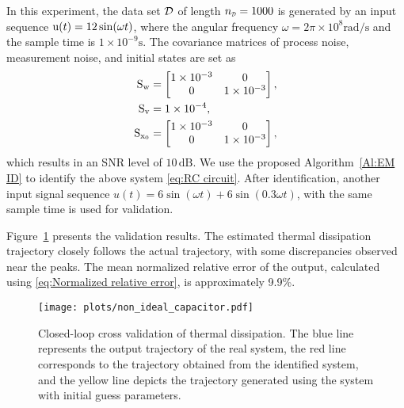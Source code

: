 In this experiment, the data set ${\mathcal{D}}$ of length $\nD = 1000$ is generated by an input sequence ${ \mathrm{u} }(t) = 12\sin(\omega t)$, where the angular frequency $\omega = 2\pi\times10^{8} \text{rad/s}$ and the sample time is $1\times10^{-9} \text{s}$. The covariance matrices of process noise, measurement noise, and initial states are set as
\begin{subequations}\label{eq:RC covariance}
\begin{align} 
        { \mathrm{S} }_{ \mathrm{w} } &= \begin{bmatrix}
            1\times10^{-3} & 0 \\ 0 & 1\times10^{-3}
        \end{bmatrix},
        \\
        { \mathrm{S} }_{ \mathrm{v} } &= 1\times10^{-4}, \\
        { \mathrm{S} }_{{ \mathrm{x} }_0} &= \begin{bmatrix}
            1\times10^{-3} & 0 \\ 0 & 1\times10^{-3}
        \end{bmatrix},
\end{align}
\end{subequations}
which results in an SNR level of $10\,\text{dB}$. We use the proposed Algorithm~\ref{Al:EM ID} to identify the above system \eqref{eq:RC circuit}. After identification, another input signal sequence $u(t) = 6\sin(\omega t) + 6\sin(0.3\omega t)$, with the same sample time is used for validation.

Figure~\ref{img:validation2} presents the validation results. The estimated thermal dissipation trajectory closely follows the actual trajectory, with some discrepancies observed near the peaks. The mean normalized relative error of the output, calculated using \eqref{eq:Normalized relative error}, is approximately 9.9\%. 


\begin{figure}[t!]
   \centering
   \texttt{[image: plots/non\_ideal\_capacitor.pdf]}
   \caption{Closed-loop cross validation of thermal dissipation. The blue line represents the output trajectory of the real system, the red line corresponds to the trajectory obtained from the identified system, and the yellow line depicts the trajectory generated using the system with initial guess parameters.}
   \label{img:validation2}
\end{figure}